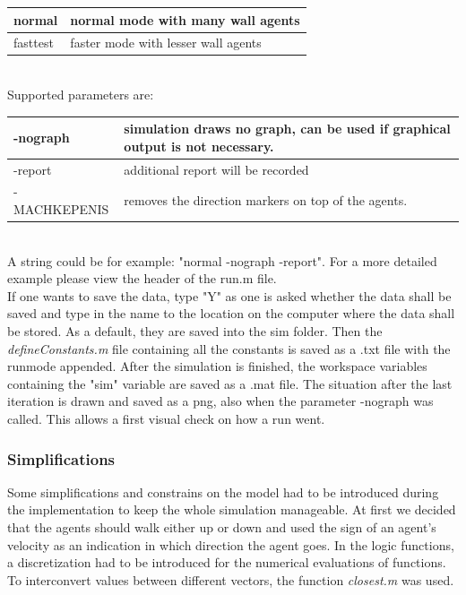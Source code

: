 \begin{tabular}{|p{3cm}|p{10cm}|}
      \hline
      normal & normal mode with many wall agents\\ \hline
      fasttest & faster mode with lesser wall agents \\ 
      \hline
\end{tabular}\\

\noi Supported parameters are:\\

\begin{tabular}{|p{3cm}|p{10cm}|}
      \hline
      -nograph & simulation draws no graph, can be used if graphical output is not necessary.\\ \hline
      -report & additional report will be recorded\\ \hline
      -MACHKEPENIS & removes the direction markers on top of the agents.\\
      \hline
\end{tabular}\\

\noi A string could be for example: "normal -nograph -report". For a more detailed example please view the header of the run.m file. \\

\noi If one wants to save the data, type "Y" as one is asked whether the data shall be saved and type in the name to the location on the computer where the data shall be stored. As a default, they are saved into the sim folder. Then the \textit{defineConstants.m} file containing all the constants is saved as a .txt file with the runmode appended. After the simulation is finished, the workspace variables containing the "sim" variable are saved as a .mat file. The situation after the last iteration is drawn and saved as a png, also when the parameter -nograph was called. This allows a first visual check on how a run went.

\subsubsection{Simplifications}
Some simplifications and constrains on the model had to be introduced during the implementation to keep the whole simulation manageable. At first we decided that the agents should walk either up or down and used the sign of an agent's velocity as an indication in which direction the agent goes. In the logic functions, a discretization had to be introduced for the numerical evaluations of functions. To interconvert values between different vectors, the function \textit{closest.m} was used.\\

